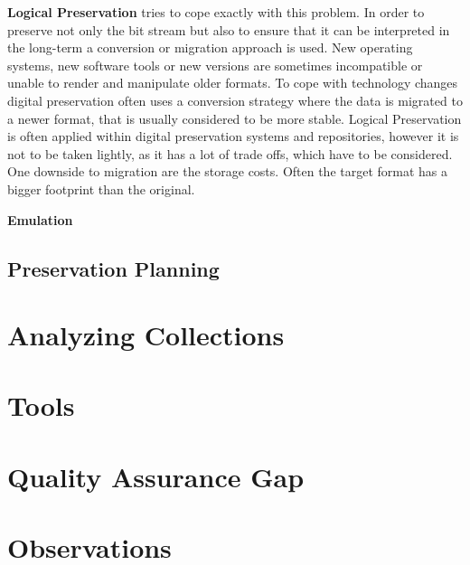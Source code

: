 \textbf{Logical Preservation} tries to cope exactly with this problem. In order to preserve not only the bit stream but also to ensure that it can be interpreted in the long-term a conversion or migration approach is used. New operating systems, new software tools or new versions are sometimes incompatible or unable to render and manipulate older formats. To cope with technology changes digital preservation often uses a conversion strategy where the data is migrated to a newer format, that is usually considered to be more stable.
Logical Preservation is often applied within digital preservation systems and repositories, however it is not to be taken lightly, as it has a lot of trade offs, which have to be considered.
One downside to migration are the storage costs. Often the target format has a bigger footprint than the original. 
\newline

\textbf{Emulation}

\subsection{Preservation Planning}
\section{Analyzing Collections}

\section{Tools}

\section{Quality Assurance Gap}

\section{Observations}
